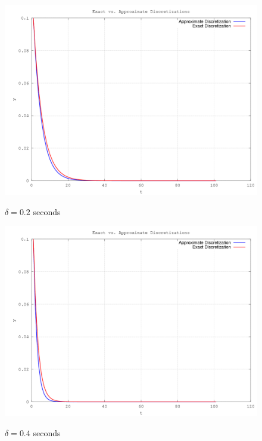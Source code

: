 \documentclass[10pt,a4paper]{article}
\begin{document}
\begin{center}
	\begin{figure}[H]
			  \includegraphics[scale=0.5]{figures/Question5Delta02.png} 
	          \label{fig:Q5Delta3}
	\caption{ $\delta = 0.2$  seconds}
	\end{figure}

	\begin{figure}[H]
			  \includegraphics[scale=0.5]{figures/Question5Delta04.png} 
	          \label{fig:Q5Delta4}
	\caption{ $\delta = 0.4$  seconds}
	\end{figure}


\end{center}
\end{document}
